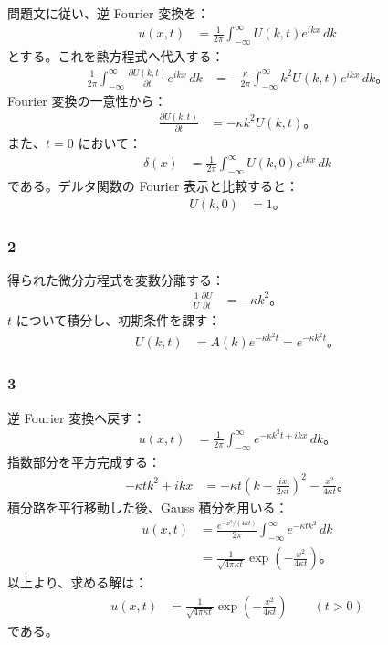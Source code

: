 \documentclass[platex,dvipdfmx,a4paper]{jsarticle}
\newcommand{\hb}[2]{\frac{\partial #1}{\partial #2}}
\begin{document}
問題文に従い、逆 Fourier 変換を：
\begin{align*}
  u(x,t)
  &=\frac{1}{2\pi}\int_{-\infty}^{\infty}U(k,t)e^{ikx}\,dk
\end{align*}
とする。これを熱方程式へ代入する：
\begin{align*}
  \frac{1}{2\pi}\int_{-\infty}^{\infty}\hb{U(k,t)}{t}e^{ikx}\,dk
  &=-\frac{\kappa}{2\pi}\int_{-\infty}^{\infty}k^2U(k,t)e^{ikx}\,dk。
\end{align*}
Fourier 変換の一意性から：
\begin{align*}
  \hb{U(k,t)}{t}
  &=-\kappa k^2U(k,t)。
\end{align*}
また、$t=0$ において：
\begin{align*}
  \delta(x)
  &=\frac{1}{2\pi}\int_{-\infty}^{\infty}U(k,0)e^{ikx}\,dk
\end{align*}
である。デルタ関数の Fourier 表示と比較すると：
\begin{align*}
  U(k,0)&=1。
\end{align*}

\subsubsection*{2}

得られた微分方程式を変数分離する：
\begin{align*}
  \frac{1}{U}\hb{U}{t}
  &=-\kappa k^2。
\end{align*}
$t$ について積分し、初期条件を課す：
\begin{align*}
  U(k,t)
  &=A(k)e^{-\kappa k^2t}
   =e^{-\kappa k^2t}。
\end{align*}

\subsubsection*{3}

逆 Fourier 変換へ戻す：
\begin{align*}
  u(x,t)
  &=\frac{1}{2\pi}\int_{-\infty}^{\infty}e^{-\kappa k^2t+ikx}\,dk。
\end{align*}
指数部分を平方完成する：
\begin{align*}
  -\kappa tk^2+ikx
  &=-\kappa t\left(k-\frac{ix}{2\kappa t}\right)^2-\frac{x^2}{4\kappa t}。
\end{align*}
積分路を平行移動した後、Gauss 積分を用いる：
\begin{align*}
  u(x,t)
  &=\frac{e^{-x^2/(4\kappa t)}}{2\pi}
    \int_{-\infty}^{\infty}e^{-\kappa tk^2}\,dk \\
  &=\frac{1}{\sqrt{4\pi\kappa t}}
    \exp\left(-\frac{x^2}{4\kappa t}\right)。
\end{align*}
以上より、求める解は：
\begin{align*}
  u(x,t)
  &=\frac{1}{\sqrt{4\pi\kappa t}}
    \exp\left(-\frac{x^2}{4\kappa t}\right)
  \qquad (t>0)
\end{align*}
である。
\end{document}
